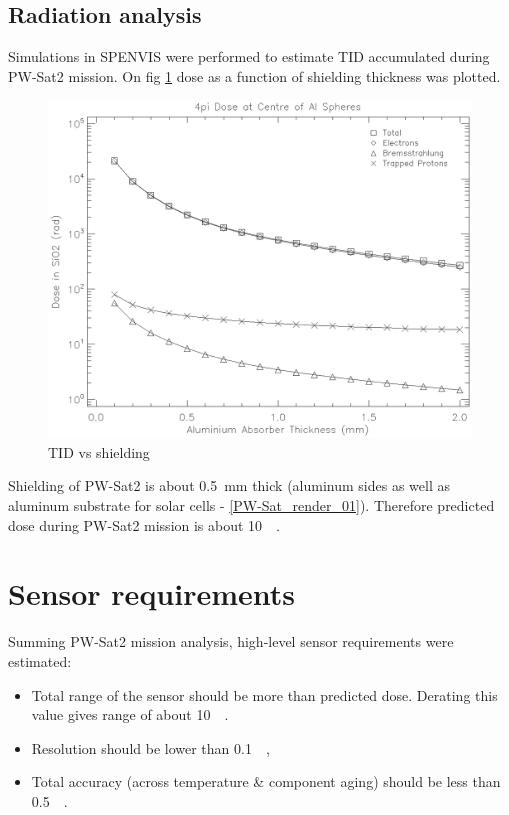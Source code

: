     \subsection{Radiation analysis}
        Simulations in SPENVIS \cite{SPENVIS_URL} were performed to estimate TID accumulated during PW-Sat2 mission. On fig \ref{TIDvsSheilding} dose as a function of shielding thickness was plotted.

        \begin{figure}[H]
            \centering
            \includegraphics[width=0.7\paperwidth]{img/dose.eps}
            \caption{TID vs shielding}
            \label{TIDvsSheilding}
        \end{figure}

        Shielding of PW-Sat2 is about \SI{0.5}{\milli\meter} thick (aluminum sides as well as aluminum substrate for solar cells - \ref{PW-Sat_render_01}). Therefore predicted dose during PW-Sat2 mission is about \SI{10}{\kilo\rad}.

\section{Sensor requirements}
    Summing PW-Sat2 mission analysis, high-level sensor requirements were estimated:

    \begin{itemize}
        \item Total range of the sensor should be more than predicted dose. Derating this value gives range of about \SI{10}{\kilo\rad}.

        \item Resolution should be lower than \SI{0.1}{\kilo\rad},

        \item Total accuracy (across temperature \& component aging) should be less than \SI{0.5}{\kilo\rad}.
    \end{itemize}

